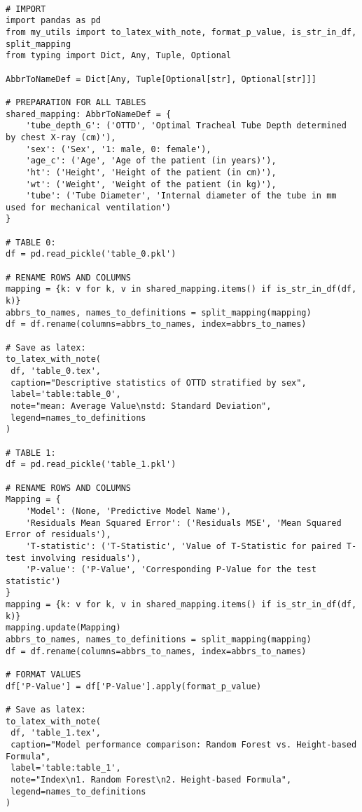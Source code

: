 \documentclass[11pt]{article}
\begin{document}
\begin{verbatim}

# IMPORT
import pandas as pd
from my_utils import to_latex_with_note, format_p_value, is_str_in_df, split_mapping
from typing import Dict, Any, Tuple, Optional

AbbrToNameDef = Dict[Any, Tuple[Optional[str], Optional[str]]]

# PREPARATION FOR ALL TABLES
shared_mapping: AbbrToNameDef = {
    'tube_depth_G': ('OTTD', 'Optimal Tracheal Tube Depth determined by chest X-ray (cm)'),
    'sex': ('Sex', '1: male, 0: female'),
    'age_c': ('Age', 'Age of the patient (in years)'),
    'ht': ('Height', 'Height of the patient (in cm)'),
    'wt': ('Weight', 'Weight of the patient (in kg)'),
    'tube': ('Tube Diameter', 'Internal diameter of the tube in mm used for mechanical ventilation')
}

# TABLE 0:
df = pd.read_pickle('table_0.pkl')

# RENAME ROWS AND COLUMNS
mapping = {k: v for k, v in shared_mapping.items() if is_str_in_df(df, k)}
abbrs_to_names, names_to_definitions = split_mapping(mapping)
df = df.rename(columns=abbrs_to_names, index=abbrs_to_names)

# Save as latex:
to_latex_with_note(
 df, 'table_0.tex',
 caption="Descriptive statistics of OTTD stratified by sex", 
 label='table:table_0',
 note="mean: Average Value\nstd: Standard Deviation",
 legend=names_to_definitions
)

# TABLE 1:
df = pd.read_pickle('table_1.pkl')

# RENAME ROWS AND COLUMNS
Mapping = {
    'Model': (None, 'Predictive Model Name'),
    'Residuals Mean Squared Error': ('Residuals MSE', 'Mean Squared Error of residuals'),
    'T-statistic': ('T-Statistic', 'Value of T-Statistic for paired T-test involving residuals'),
    'P-value': ('P-Value', 'Corresponding P-Value for the test statistic')
}
mapping = {k: v for k, v in shared_mapping.items() if is_str_in_df(df, k)}
mapping.update(Mapping)
abbrs_to_names, names_to_definitions = split_mapping(mapping)
df = df.rename(columns=abbrs_to_names, index=abbrs_to_names)

# FORMAT VALUES
df['P-Value'] = df['P-Value'].apply(format_p_value)

# Save as latex:
to_latex_with_note(
 df, 'table_1.tex',
 caption="Model performance comparison: Random Forest vs. Height-based Formula", 
 label='table:table_1',
 note="Index\n1. Random Forest\n2. Height-based Formula",
 legend=names_to_definitions
)

\end{verbatim}
\end{document}
